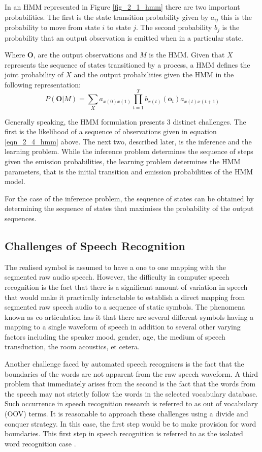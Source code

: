 In an HMM represented in Figure \ref{fig_2_1_hmm} there are two important probabilities.  The first is the state transition probability given by $a_{ij}$ this is the probability to move from state $i$ to state $j$.  The second probability $b_j$ is the probability that an output observation is emitted when in a particular state.

Where $\mathbf{O}$, are the output observations and $M$ is the HMM.  Given that $X$ represents the sequence of states transitioned by a process, a HMM defines the joint probability of $X$ and the output probabilities given the HMM in the following representation:
\begin{equation}P(\mathbf{O}|M)=\sum_Xa_{x(0)x(1)}\prod_{t=1}^Tb_{x(t)}(\mathbf{o}_t)a_{x(t)x(t+1)}
\label{eqn_2_4_hmm}
\end{equation}

Generally speaking, the HMM formulation presents 3 distinct challenges.  The first is the likelihood of a sequence of observations given in equation \ref{eqn_2_4_hmm} above.  The next two,  described later, is the inference and the learning problem.  While the inference problem determines the sequence of steps given the emission probabilities, the learning problem determines the HMM parameters, that is the initial transition and emission probabilities of the HMM model.

For the case of the inference problem, the sequence of states can be obtained by determining the sequence of states that maximises the probability of the output sequences.

\subsection{Challenges of Speech Recognition}\label{sec_c2_asr_challenges}
The realised symbol is assumed to have a one to one mapping with the segmented raw audio speech. However, the difficulty in computer speech recognition is the fact that there is a significant amount of variation in speech that would make it practically intractable to establish a direct mapping from segmented raw speech audio to a sequence of static symbols. The phenomena known as co articulation has it that there are several different symbols having a mapping to a single waveform of speech in addition to several other varying factors including the speaker mood, gender, age, the medium of speech transduction, the room acoustics, et cetera.

Another challenge faced by automated speech recognisers is the fact that the boundaries of the words are not apparent from the raw speech waveform. A third problem that immediately arises from the second is the fact that the words from the speech may not strictly follow the words in the selected vocabulary database.  Such occurrence in speech recognition research is referred to as out of vocabulary (OOV) terms.  It is reasonable to approach these challenges using a divide and conquer strategy.  In this case, the first step would be to make provision for word boundaries.  This first step in speech recognition is referred to as the isolated word recognition case \citep{young2002htk}.

